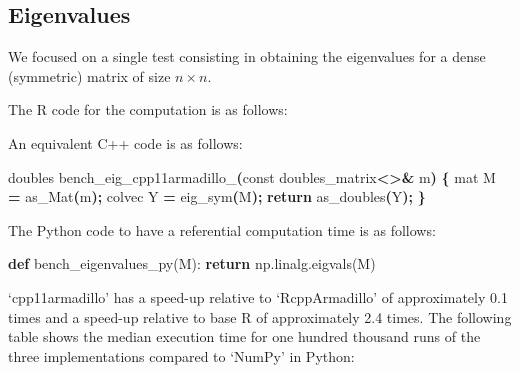 \documentclass[preprint,12pt, a4paper]{elsarticle}
\newenvironment{Shaded}{\begin{snugshade}}{\end{snugshade}}
\newcommand{\AttributeTok}[1]{\textcolor[rgb]{0.77,0.63,0.00}{#1}}
\newcommand{\ControlFlowTok}[1]{\textcolor[rgb]{0.13,0.29,0.53}{\textbf{#1}}}
\newcommand{\FunctionTok}[1]{\textcolor[rgb]{0.00,0.00,0.00}{#1}}
\newcommand{\KeywordTok}[1]{\textcolor[rgb]{0.13,0.29,0.53}{\textbf{#1}}}
\newcommand{\NormalTok}[1]{#1}
\newcommand{\OperatorTok}[1]{\textcolor[rgb]{0.81,0.36,0.00}{\textbf{#1}}}
\newcommand{\OtherTok}[1]{\textcolor[rgb]{0.56,0.35,0.01}{#1}}
\newcommand{\SpecialCharTok}[1]{\textcolor[rgb]{0.00,0.00,0.00}{#1}}
\newcommand{\VariableTok}[1]{\textcolor[rgb]{0.00,0.00,0.00}{#1}}
\begin{document}
\subsection{Eigenvalues}\label{eigenvalues}

We focused on a single test consisting in obtaining the eigenvalues for
a dense (symmetric) matrix of size \(n \times n\).

The R code for the computation is as follows:

\begin{Shaded}
\end{Shaded}

An equivalent C++ code is as follows:

\begin{Shaded}
\begin{Highlighting}[]
\NormalTok{doubles }\VariableTok{bench\_eig\_cpp11armadillo\_}\OperatorTok{(}\AttributeTok{const}\NormalTok{ doubles\_matrix}\OperatorTok{\textless{}\textgreater{}\&}\NormalTok{ m}\OperatorTok{)} \OperatorTok{\{}
\NormalTok{  mat M }\OperatorTok{=}\NormalTok{ as\_Mat}\OperatorTok{(}\NormalTok{m}\OperatorTok{);}
\NormalTok{  colvec Y }\OperatorTok{=}\NormalTok{ eig\_sym}\OperatorTok{(}\NormalTok{M}\OperatorTok{);}
  \ControlFlowTok{return}\NormalTok{ as\_doubles}\OperatorTok{(}\NormalTok{Y}\OperatorTok{);}
\OperatorTok{\}}
\end{Highlighting}
\end{Shaded}

The Python code to have a referential computation time is as follows:

\begin{Shaded}
\begin{Highlighting}[]
\KeywordTok{def}\NormalTok{ bench\_eigenvalues\_py(M):}
    \ControlFlowTok{return}\NormalTok{ np.linalg.eigvals(M)}
\end{Highlighting}
\end{Shaded}

`cpp11armadillo' has a speed-up relative to `RcppArmadillo' of
approximately 0.1 times and a speed-up relative to base R of
approximately 2.4 times. The following table shows the median execution
time for one hundred thousand runs of the three implementations compared
to `NumPy' in Python:
\end{document}
